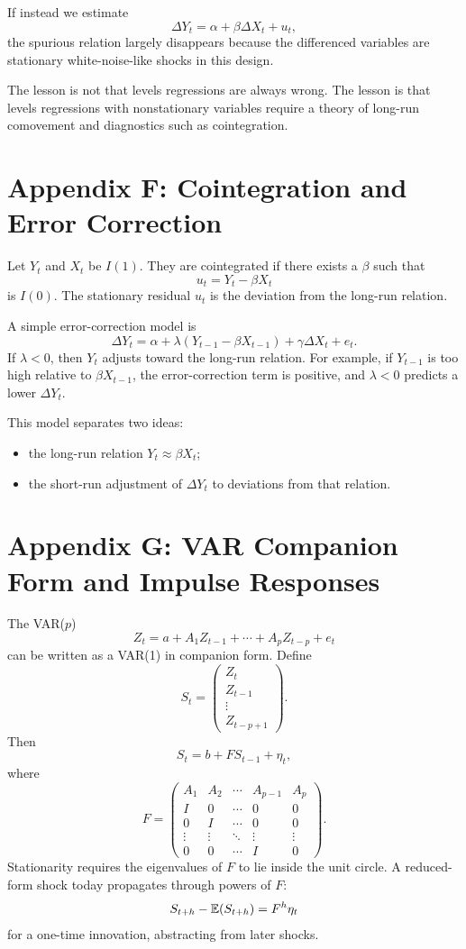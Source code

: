 If instead we estimate
\[
\Delta Y_t=\alpha+\beta\Delta X_t+u_t,
\]
the spurious relation largely disappears because the differenced variables are stationary white-noise-like shocks in this design.

The lesson is not that levels regressions are always wrong. The lesson is that levels regressions with nonstationary variables require a theory of long-run comovement and diagnostics such as cointegration.

\section{Appendix F: Cointegration and Error Correction}
Let $Y_t$ and $X_t$ be $I(1)$. They are cointegrated if there exists a $\beta$ such that
\[
u_t=Y_t-\beta X_t
\]
is $I(0)$. The stationary residual $u_t$ is the deviation from the long-run relation.

A simple error-correction model is
\[
\Delta Y_t=\alpha+\lambda(Y_{t-1}-\beta X_{t-1})+\gamma\Delta X_t+e_t.
\]
If $\lambda<0$, then $Y_t$ adjusts toward the long-run relation. For example, if $Y_{t-1}$ is too high relative to $\beta X_{t-1}$, the error-correction term is positive, and $\lambda<0$ predicts a lower $\Delta Y_t$.

This model separates two ideas:
\begin{itemize}
\item the long-run relation $Y_t\approx \beta X_t$;
\item the short-run adjustment of $\Delta Y_t$ to deviations from that relation.
\end{itemize}

\section{Appendix G: VAR Companion Form and Impulse Responses}
The VAR($p$)
\[
Z_t=a+A_1Z_{t-1}+\cdots+A_pZ_{t-p}+e_t
\]
can be written as a VAR(1) in companion form. Define
\[
S_t=
\begin{pmatrix}
Z_t\\
Z_{t-1}\\
\vdots\\
Z_{t-p+1}
\end{pmatrix}.
\]
Then
\[
S_t=b+FS_{t-1}+\eta_t,
\]
where
\[
F=
\begin{pmatrix}
A_1 & A_2 & \cdots & A_{p-1} & A_p\\
I & 0 & \cdots & 0 & 0\\
0 & I & \cdots & 0 & 0\\
\vdots & \vdots & \ddots & \vdots & \vdots\\
0 & 0 & \cdots & I & 0
\end{pmatrix}.
\]
Stationarity requires the eigenvalues of $F$ to lie inside the unit circle. A reduced-form shock today propagates through powers of $F$:
\[
S_{t+h}-\mathbb{E}(S_{t+h})=F^h\eta_t
\]
for a one-time innovation, abstracting from later shocks.

